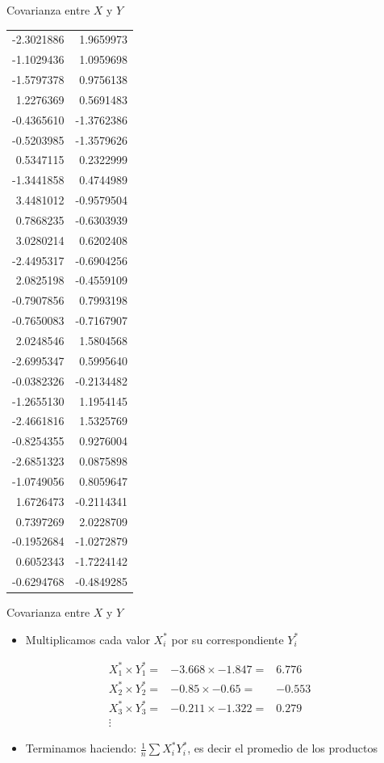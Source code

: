 \documentclass[
  11pt,
  ignorenonframetext,
]{beamer}
\providecommand{\tightlist}{%
  \setlength{\itemsep}{0pt}\setlength{\parskip}{0pt}}
\begin{document}
\begin{frame}{Covarianza entre \(X\) y \(Y\)}
\begin{longtable}[]{@{}rr@{}}
-2.3021886 & 1.9659973 \\
-1.1029436 & 1.0959698 \\
-1.5797378 & 0.9756138 \\
1.2276369 & 0.5691483 \\
-0.4365610 & -1.3762386 \\
-0.5203985 & -1.3579626 \\
0.5347115 & 0.2322999 \\
-1.3441858 & 0.4744989 \\
3.4481012 & -0.9579504 \\
0.7868235 & -0.6303939 \\
3.0280214 & 0.6202408 \\
-2.4495317 & -0.6904256 \\
2.0825198 & -0.4559109 \\
-0.7907856 & 0.7993198 \\
-0.7650083 & -0.7167907 \\
2.0248546 & 1.5804568 \\
-2.6995347 & 0.5995640 \\
-0.0382326 & -0.2134482 \\
-1.2655130 & 1.1954145 \\
-2.4661816 & 1.5325769 \\
-0.8254355 & 0.9276004 \\
-2.6851323 & 0.0875898 \\
-1.0749056 & 0.8059647 \\
1.6726473 & -0.2114341 \\
0.7397269 & 2.0228709 \\
-0.1952684 & -1.0272879 \\
0.6052343 & -1.7224142 \\
-0.6294768 & -0.4849285 \\
\bottomrule()
\end{longtable}
\end{frame}

\begin{frame}{Covarianza entre \(X\) y \(Y\)}
\protect\hypertarget{covarianza-entre-x-y-y-3}{}
\begin{itemize}
\tightlist
\item
  Multiplicamos cada valor \(X^*_i\) por su correspondiente \(Y^*_i\)
\end{itemize}

\begin{align*}
X^*_1 \times Y^*_1 =  & -3.668 \times -1.847 = & 6.776 \\
X^*_2 \times Y^*_2 =  & -0.85 \times -0.65 = & -0.553 \\
X^*_3 \times Y^*_3 =  & -0.211 \times -1.322 = & 0.279 \\
\vdots
\end{align*}

\begin{itemize}
\tightlist
\item
  Terminamos haciendo: \(\frac{1}{n}\sum X^*_i Y^*_i\), es decir el
  promedio de los productos
\end{itemize}
\end{frame}
\end{document}
